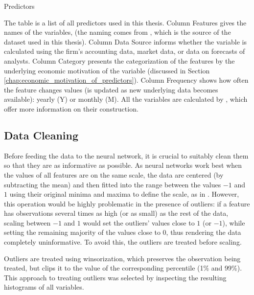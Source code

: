 		\begin{table}
			\resizebox{\textwidth}{!}{}
			\caption{Predictors}
			\label{tab:meta}
			\medskip
			\small
			The table is a list of all predictors used in this thesis. Column Features gives the names of the variables, (the naming comes from \cite{tobek2020does}, which is the source of the dataset used in this thesis).  
			Column Data Source informs whether the variable is calculated using the firm's accounting data, market data, or data on forecasts of analysts. Column Category presents the categorization of the features by the underlying economic motivation of the variable (discussed in Section \ref{chap:economic_motivation_of_predictors}). Column Frequency shows how often the feature changes values (is updated as new underlying data becomes available): yearly (Y) or monthly (M). All the variables are calculated by \cite{tobek2020does}, which offer more information on their construction. 
		\end{table}
	
	\subsection{Data Cleaning}
	
		Before feeding the data to the neural network, it is crucial to suitably clean them so that they are as informative as possible. As neural networks work best when the values of all features are on the same scale, the data are centered (by subtracting the mean) and then fitted into the range between the values $-1$ and $1$ using their original minima and maxima to define the scale, as in \cite{gu2020empirical}. However, this operation would be highly problematic in the presence of outliers: if a feature has observations several times as high (or as small) as the rest of the data, scaling between $-1$ and $1$ would set the outliers' values close to $1$ (or $-1$), while setting the remaining majority of the values close to 0, thus rendering the data completely uninformative. To avoid this, the outliers are treated before scaling.
		
		Outliers are treated using winsorization, which preserves the observation being treated, but clips it to the value of the corresponding percentile (1\% and 99\%). This approach to treating outliers was selected by inspecting the resulting histograms of all variables.     
		
